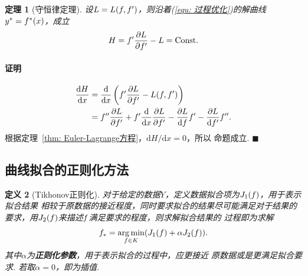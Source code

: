 \documentclass[12pt, a4paper]{article}
\theoremstyle{margin}
\newtheorem{thm}{定理}
\newtheorem{defi}[thm]{定义}
\newtheorem{exa}[thm]{例}
\newcommand{\pr}{\prime}
\DeclareMathOperator*{\agm}{arg\,min}
\newcommand{\hp}{^\prime}
\newcommand{\tbf}{\textbf}
\newcommand{\f}{\mathnormal{f}}
\newcommand{\rd}{\mathrm{d}}
\newcommand\thmref[1]{定理~\ref{#1}}
\newcommand\equref[1]{(\ref{#1})}
\newcommand{\proof}{\paragraph{证明}}
\begin{document}
  \begin{thm}[守恒律定理]
    \label{thm: 守恒律定理}
    设$L = L(\f,\f\hp)$，则沿着\equref{equ: 过程优化}的解曲线
    $y^* = \f^*(x)$，成立
    \[
      H = \f\hp\frac{\partial L}{\partial\f\hp} - L = \text{Const}.
    \]
  \end{thm}
  \proof
    \[\begin{split}
     \frac{\rd H}{\rd x} &= \frac{\rd}{\rd x}
     \left( \f\hp\frac{\partial L}{\partial\f\hp}-L(\f,\f\hp) \right)\\
     &= \f^{\pr\pr}\frac{\partial L}{\partial\f\hp}
     + \f\hp\frac{\rd}{\rd x}\frac{\partial L}{\partial\f\hp} -
     \frac{\partial L}{\rd\f}\f\hp -
     \frac{\partial L}{\rd\f\hp}\f^{\pr\pr}.
    \end{split}\]
    根据\thmref{thm: Euler-Lagrange方程}，$\rd H /\rd x =0$，所以
    命题成立. $\blacksquare$


\newpage
\subsection{曲线拟合的正则化方法}
  \begin{defi}[Tikhonov正则化]
    \label{def: Tikhonov正则化}
    对于给定的数据$Y$，定义数据拟合项为$J_1(\f)$，用于表示拟合结果
    相较于原数据的接近程度，同时要求拟合的结果尽可能满足对于结果的
    要求，用$J_2(\f)$来描述$\f$满足要求的程度，则求解拟合结果的
    过程即为求解
    \[
      \f_* = \agm_{\f\in K}(J_1(\f) + \alpha J_2(\f)).
    \]
    其中$\alpha$为\tbf{正则化参数}，用于表示拟合的过程中，应更接近
    原数据或是更满足拟合要求. 若取$\alpha=0$，即为插值.
  \end{defi}
\end{document}
